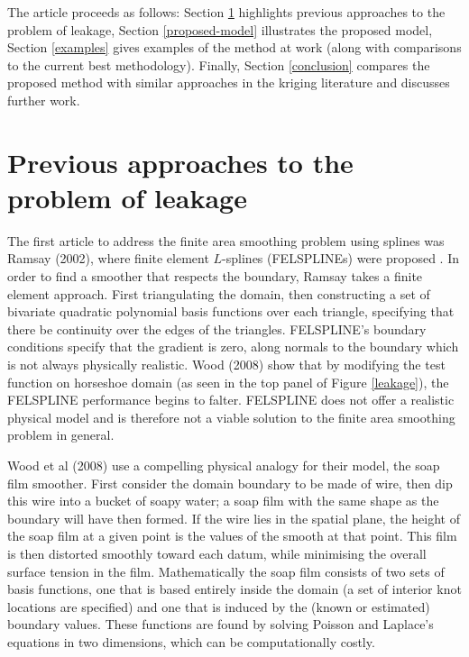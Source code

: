 \documentclass[useAMS, referee]{biom}
\begin{document}
The article proceeds as follows: Section \ref{previous-approaches} highlights previous approaches to the problem of leakage, Section \ref{proposed-model} illustrates the proposed model, Section \ref{examples} gives examples of the method at work (along with comparisons to the current best methodology). Finally, Section \ref{conclusion} compares the proposed method with similar approaches in the kriging literature and discusses further work.

\section{Previous approaches to the problem of leakage}
\label{previous-approaches}

The first article to address the finite area smoothing problem using splines was Ramsay (2002), where finite element $L$-splines (FELSPLINEs) were proposed . In order to find a smoother that respects the boundary, Ramsay takes a finite element approach. First triangulating the domain, then constructing a set of bivariate quadratic polynomial basis functions over each triangle, specifying that there be continuity over the edges of the triangles. FELSPLINE's boundary conditions specify that the gradient is zero, along normals to the boundary which is not always physically realistic. Wood (2008) show that by modifying the test function on horseshoe domain (as seen in the top panel of Figure \ref{leakage}), the FELSPLINE performance begins to falter. FELSPLINE does not offer a realistic physical model and is therefore not a viable solution to the finite area smoothing problem in general.

Wood et al (2008) use a compelling physical analogy for their model, the soap film smoother. First consider the domain boundary to be made of wire, then dip this wire into a bucket of soapy water; a soap film with the same shape as the boundary will have then formed. If the wire lies in the spatial plane, the height of the soap film at a given point is the values of the smooth at that point. This film is then distorted smoothly toward each datum, while minimising the overall surface tension in the film. Mathematically the soap film consists of two sets of basis functions, one that is based entirely inside the domain (a set of interior knot locations are specified) and one that is induced by the (known or estimated) boundary values. These functions are found by solving Poisson and Laplace's equations in two dimensions, which can be computationally costly.
\end{document}

